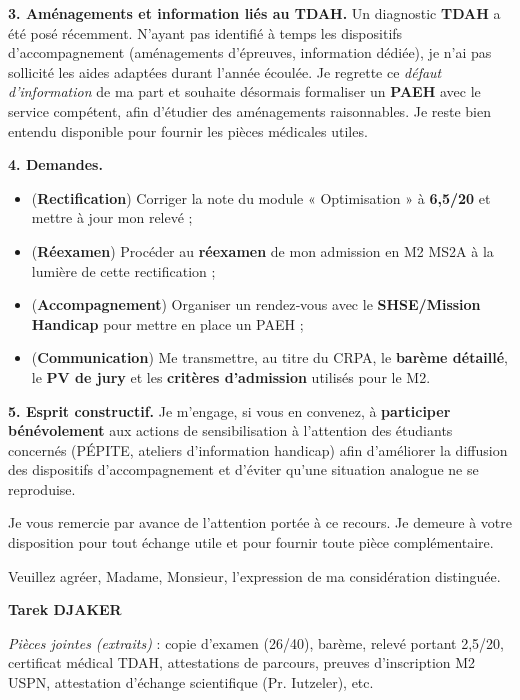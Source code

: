 \documentclass[11pt,a4paper]{article}
\begin{document}
\textbf{3. Aménagements et information liés au TDAH.}
Un diagnostic \textbf{TDAH} a été posé récemment. N’ayant pas identifié à temps les dispositifs
d’accompagnement (aménagements d’épreuves, information dédiée), je n’ai pas sollicité les aides
adaptées durant l’année écoulée. Je regrette ce \textit{défaut d’information} de ma part et souhaite désormais
formaliser un \textbf{PAEH} avec le service compétent, afin d’étudier des aménagements raisonnables.
Je reste bien entendu disponible pour fournir les pièces médicales utiles.

\textbf{4. Demandes.}
\begin{itemize}
  \item (\textbf{Rectification}) Corriger la note du module « Optimisation » à \textbf{6,5/20} et mettre à jour mon relevé ;
  \item (\textbf{Réexamen}) Procéder au \textbf{réexamen} de mon admission en M2 MS2A à la lumière de cette rectification ;
  \item (\textbf{Accompagnement}) Organiser un rendez‑vous avec le \textbf{SHSE/Mission Handicap} pour mettre en place un PAEH ;
  \item (\textbf{Communication}) Me transmettre, au titre du CRPA, le \textbf{barème détaillé}, le \textbf{PV de jury} et les \textbf{critères d’admission}
        utilisés pour le M2.
\end{itemize}

\textbf{5. Esprit constructif.}
Je m’engage, si vous en convenez, à \textbf{participer bénévolement} aux actions de sensibilisation à l’attention
des étudiants concernés (PÉPITE, ateliers d’information handicap) afin d’améliorer la diffusion des dispositifs
d’accompagnement et d’éviter qu’une situation analogue ne se reproduise.

Je vous remercie par avance de l’attention portée à ce recours. Je demeure à votre disposition pour tout échange
utile et pour fournir toute pièce complémentaire.

Veuillez agréer, Madame, Monsieur, l’expression de ma considération distinguée.

\vspace{0.3cm}
\textbf{Tarek DJAKER}

\textit{Pièces jointes (extraits)} : copie d’examen (26/40), barème, relevé portant 2,5/20, certificat médical TDAH, attestations de parcours, preuves d’inscription M2 USPN, attestation d’échange scientifique (Pr. Iutzeler), etc.
\end{document}
